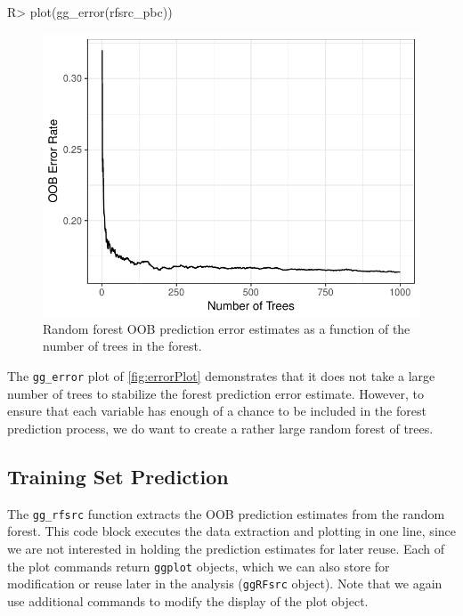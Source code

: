 \documentclass[article]{jss}
\begin{document}
\begin{Schunk}
\begin{Sinput}
R> plot(gg_error(rfsrc_pbc))
\end{Sinput}
\begin{figure}[!htb]

{\centering \includegraphics{rfs-errorPlot-1} 

}

\caption[Random forest OOB prediction error estimates as a function of the number of trees in the forest]{Random forest OOB prediction error estimates as a function of the number of trees in the forest.}\label{fig:errorPlot}
\end{figure}
\end{Schunk}

The \texttt{gg\_error} plot of \autoref{fig:errorPlot} demonstrates that
it does not take a large number of trees to stabilize the forest
prediction error estimate. However, to ensure that each variable has
enough of a chance to be included in the forest prediction process, we
do want to create a rather large random forest of trees.

\subsection{Training Set Prediction}\label{training-set-prediction}

The \texttt{gg\_rfsrc} function extracts the OOB prediction estimates
from the random forest. This code block executes the data extraction and
plotting in one line, since we are not interested in holding the
prediction estimates for later reuse. Each of the 
plot commands return \texttt{ggplot} objects, which we can also store
for modification or reuse later in the analysis (\texttt{ggRFsrc}
object). Note that we again use additional  commands to
modify the display of the plot object.
\end{document}
